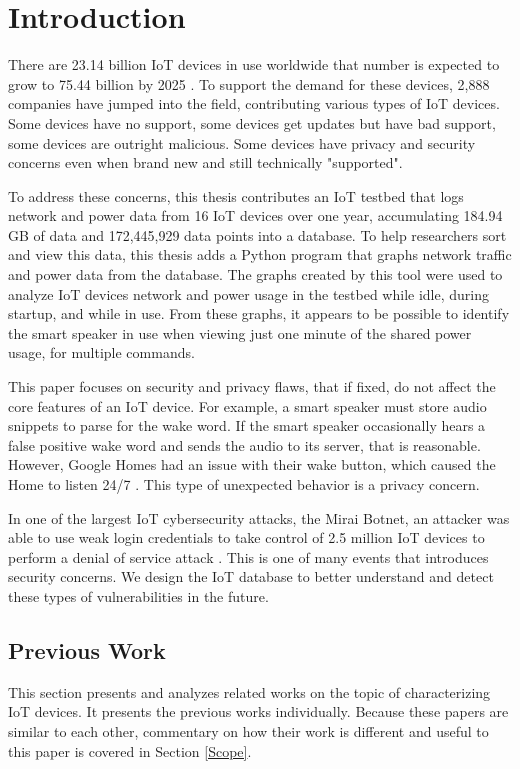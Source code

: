 \chapter{Introduction}
\label{Introduction}
There are 23.14 billion IoT devices in use worldwide that number is expected to grow to 75.44 billion by 2025 \cite{statista_2016}. To support the demand for these devices, 2,888 companies have jumped into the field, contributing various types of IoT devices. Some devices have no support, some devices get updates but have bad support, some devices are outright malicious. Some devices have privacy and security concerns even when brand new and still technically "supported".

To address these concerns, this thesis contributes an IoT testbed that logs network and power data from 16 IoT devices over one year, accumulating 184.94 GB of data and 172,445,929 data points into a database. To help researchers sort and view this data, this thesis adds a Python \cite{python} program that graphs network traffic and power data from the database. The graphs created by this tool were used to analyze IoT devices network and power usage in the testbed while idle, during startup, and while in use. From these graphs, it appears to be possible to identify the smart speaker in use when viewing just one minute of the shared power usage, for multiple commands.

This paper focuses on security and privacy flaws, that if fixed, do not affect the core features of an IoT device. For example, a smart speaker must store audio snippets to parse for the wake word. If the smart speaker occasionally hears a false positive wake word and sends the audio to its server, that is reasonable. However, Google Homes had an issue with their wake button, which caused the Home to listen 24/7 \cite{burke_2017}. This type of unexpected behavior is a privacy concern.

In one of the largest IoT cybersecurity attacks, the Mirai Botnet, an attacker was able to use weak login credentials to take control of 2.5 million IoT devices to perform a denial of service attack \cite{whittaker_2017}. This is one of many events that introduces security concerns. We design the IoT database to better understand and detect these types of vulnerabilities in the future.

\section{Previous Work}
\label{Previous Work}
This section presents and analyzes related works on the topic of characterizing IoT devices. It presents the previous works individually. Because these papers are similar to each other, commentary on how their work is different and useful to this paper is covered in Section \ref{Scope}.

